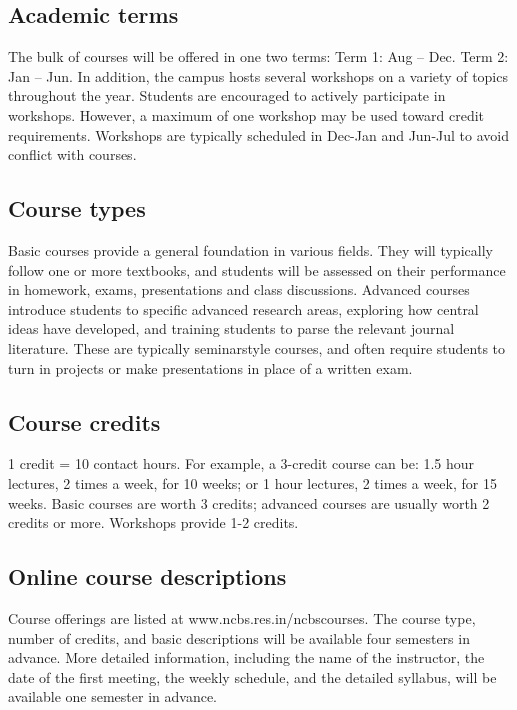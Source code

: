 \documentclass[a4paper]{extarticle}
\begin{document}
\subsection{Academic terms}
The bulk of courses will be offered in one two terms: Term 1: Aug – Dec.
Term 2: Jan – Jun. In addition, the campus hosts several workshops on a variety of topics
throughout the year. Students are encouraged to actively participate in workshops. However,
a maximum of one workshop may be used toward credit requirements. Workshops are
typically scheduled in Dec-Jan and Jun-Jul to avoid conflict with courses.

\subsection{Course types} Basic courses provide a general foundation in various
fields. They will typically follow one or more textbooks, and students will be
assessed on their performance in homework, exams, presentations and class
discussions. Advanced courses introduce students to specific advanced research
areas, exploring how central ideas have developed, and training students to
parse the relevant journal literature. These are typically seminarstyle courses,
and often require students to turn in projects or make presentations in place of
a written exam.

\subsection{Course credits} 
1 credit = 10 contact hours. For example, a 3-credit course can be: 1.5 hour
lectures, 2 times a week, for 10 weeks; or 1 hour lectures, 2 times a week, for 15 weeks.
Basic courses are worth 3 credits; advanced courses are usually worth 2 credits or more.
Workshops provide 1-2 credits.

\subsection{Online course descriptions}
Course offerings are listed at www.ncbs.res.in/ncbscourses.
The course type, number of credits, and basic descriptions will be available four semesters
in advance. More detailed information, including the name of the instructor, the date of the
first meeting, the weekly schedule, and the detailed syllabus, will be available one semester
in advance.
\end{document}
